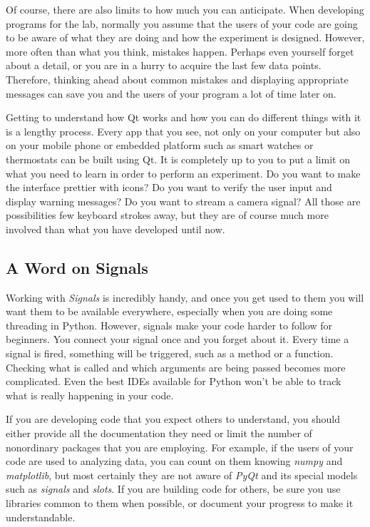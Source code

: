 Of course, there are also limits to how much you can anticipate. When
developing programs for the lab, normally you assume that the users of
your code are going to be aware of what they are doing and how the
experiment is designed. However, more often than what you think,
mistakes happen. Perhaps even yourself forget about a detail, or you are
in a hurry to acquire the last few data points. Therefore, thinking
ahead about common mistakes and displaying appropriate messages can save
you and the users of your program a lot of time later on.

Getting to understand how Qt works and how you can do different things
with it is a lengthy process. Every app that you see, not only on your
computer but also on your mobile phone or embedded platform such as
smart watches or thermostats can be built using Qt. It is completely up
to you to put a limit on what you need to learn in order to perform an
experiment. Do you want to make the interface prettier with icons? Do
you want to verify the user input and display warning messages? Do you
want to stream a camera signal? All those are possibilities few keyboard
strokes away, but they are of course much more involved than what you
have developed until now.

\subsection{A Word on Signals}\label{a-word-onsignals}
Working with \emph{Signals} is incredibly handy, and once you get used
to them you will want them to be available everywhere, especially when
you are doing some threading in Python. However, signals make your code
harder to follow for beginners. You connect your signal once and you
forget about it. Every time a signal is fired, something will be
triggered, such as a method or a function. Checking what is called and
which arguments are being passed becomes more complicated. Even the best
IDEs available for Python won't be able to track what is really
happening in your code.

If you are developing code that you expect others to understand, you
should either provide all the documentation they need or limit the number of nonordinary packages that you are employing. For example, if
the users of your code are used to analyzing data, you can count on them
knowing \emph{numpy} and \emph{matplotlib}, but most certainly they are
not aware of \emph{PyQt} and its special models such as \emph{signals}
and \emph{slots}. If you are building code for others, be sure you use
libraries common to them when possible, or document your progress to
make it understandable.


